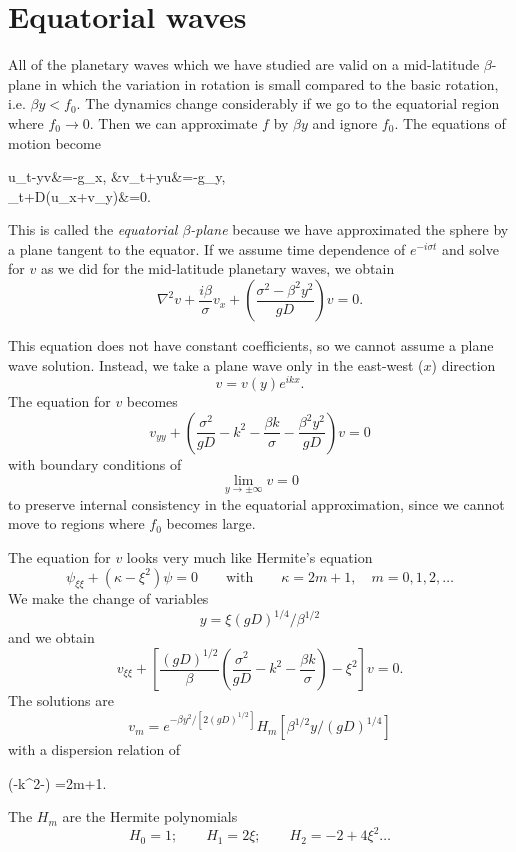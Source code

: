 \section{Equatorial waves}

All of the planetary waves which we have studied are valid on a mid-latitude
$\beta$-plane in which the variation in rotation is small compared to the basic
rotation, i.e. $\beta y<f_0$. The dynamics change considerably if we go to the
equatorial region where $f_0\to0$. Then we can approximate $f$ by $\beta y$ and
ignore $f_0$. The equations of motion become
\begin{wavealign}
	u_t-\beta yv&=-g\eta_x,
	&v_t+\beta yu&=-g\eta_y,\\
	\eta_t+D(u_x+v_y)&=0.
\end{wavealign}
This is called the \emph{equatorial $\beta$-plane} because we have approximated the
sphere by a plane tangent to the equator. If we assume time dependence of
$e^{-i\sigma t}$ and solve for $v$ as we did for the mid-latitude planetary waves, we
obtain
\[
	\nabla^2v+\frac{i\beta}{\sigma}v_x
	+\left(\frac{\sigma^2-\beta^2y^2}{gD}\right)v=0.
\]

\sourcepagebreak

This equation does not have constant coefficients, so we cannot assume a plane wave
solution. Instead, we take a plane wave only in the east-west ($x$) direction
\[
	v=v(y)e^{ikx}.
\]
The equation for $v$ becomes
\[
	v_{yy}+\left(
	\frac{\sigma^2}{gD}-k^2-\frac{\beta k}{\sigma}
	-\frac{\beta^2y^2}{gD}
	\right)v=0
\]
with boundary conditions of
\[
	\lim_{y\to\pm\infty}v=0
\]
to preserve internal consistency in the equatorial approximation, since we cannot move
to regions where $f_0$ becomes large.

The equation for $v$ looks very much like Hermite's equation
\[
	\psi_{\xi\xi}+(\kappa-\xi^2)\psi=0
	\qquad\text{with}\qquad
	\kappa=2m+1,\quad m=0,1,2,\ldots
\]
We make the change of variables
\[
	y=\xi(gD)^{1/4}/\beta^{1/2}
\]
and we obtain
\[
	v_{\xi\xi}+\left[
		\frac{(gD)^{1/2}}{\beta}
		\left(\frac{\sigma^2}{gD}-k^2-\frac{\beta k}{\sigma}\right)
		-\xi^2
		\right]v=0.
\]
The solutions are
\[
	v_m=e^{-\beta y^2/[2(gD)^{1/2}]}
	H_m\!\left[\beta^{1/2}y/(gD)^{1/4}\right]
\]
with a dispersion relation of
\begin{waveequation}
	\left(-k^2-\right)
	=2m+1.
\end{waveequation}
The $H_m$ are the Hermite polynomials
\[
	H_0=1;\qquad H_1=2\xi;\qquad H_2=-2+4\xi^2\ldots
\]

